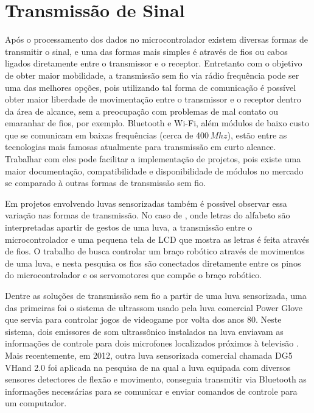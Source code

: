 \documentclass[
	12pt,				%
	openright,			%
	oneside,			%
	a4paper,			%
	english,			%
	brazil				%
	]{abntex2}
\begin{document}
		\section{Transmissão de Sinal}
		
		Após o processamento dos dados no microcontrolador existem diversas formas de transmitir o sinal, e uma das formas mais simples é através de fios ou cabos ligados diretamente entre o transmissor e o receptor. Entretanto com o objetivo de obter maior mobilidade, a transmissão sem fio via rádio frequência pode ser uma das melhores opções, pois utilizando tal forma de comunicação é possível obter maior liberdade de movimentação entre o transmissor e o receptor dentro da área de alcance, sem a preocupação com problemas de mal contato ou emaranhar de fios, por exemplo. Bluetooth e Wi-Fi, além módulos de baixo custo que se comunicam em baixas frequências (cerca de 400$\,Mhz$), estão entre as tecnologias mais famosas atualmente para transmissão em curto alcance. Trabalhar com eles pode facilitar a implementação de projetos, pois existe uma maior documentação, compatibilidade e disponibilidade de módulos no mercado se comparado à outras formas de transmissão sem fio.
		
		Em projetos envolvendo luvas sensorizadas também é possivel observar essa variação nas formas de transmissão. No caso de \cite{solanki2013sign}, onde letras do alfabeto são interpretadas apartir de gestos de uma luva, a transmissão entre o microcontrolador e uma pequena tela de LCD que mostra as letras é feita através de fios. O trabalho de \cite{syed2012armcontroller} busca controlar um braço robótico através de movimentos de uma luva, e nesta pesquisa os fios são conectados diretamente entre os pinos do microcontrolador e os servomotores que compõe o braço robótico.

		Dentre as soluções de transmissão sem fio a partir de uma luva sensorizada, uma das primeiras foi o sistema de ultrassom usado pela luva comercial Power Glove que servia para controlar jogos de videogame por volta dos anos 80. Neste sistema, dois emissores de som ultrassônico instalados na luva enviavam as informações de controle para dois microfones localizados próximos à televisão \cite{dana1989powerglove}. Mais recentemente, em 2012, outra luva sensorizada comercial chamada DG5 VHand 2.0 foi aplicada na pesquisa de \cite{kumar2012hci} na qual a luva equipada com diversos sensores detectores de flexão e movimento, conseguia transmitir via Bluetooth as informações necessárias para se comunicar e enviar comandos de controle para um computador.
\end{document}
